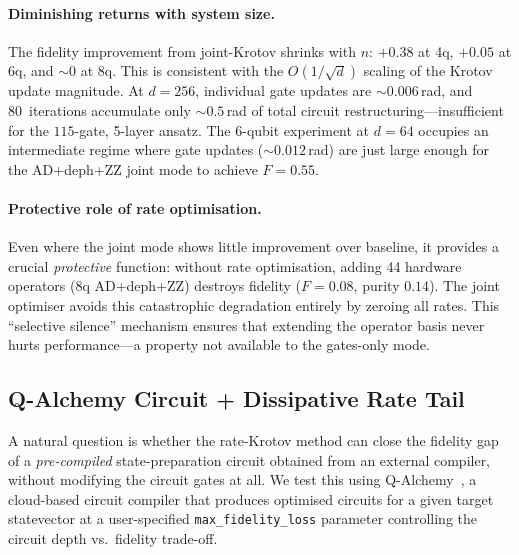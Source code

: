\documentclass[11pt,a4paper]{article}
\begin{document}
\paragraph{Diminishing returns with system size.}
The fidelity improvement from joint-Krotov shrinks with $n$: $+0.38$
at 4q, $+0.05$ at 6q, and ${\sim}0$ at 8q.  This is consistent with
the $O(1/\sqrt{d})$ scaling of the Krotov update magnitude.  At
$d = 256$, individual gate updates are ${\sim}0.006$\,rad, and
80~iterations accumulate only ${\sim}0.5$\,rad of total circuit
restructuring---insufficient for the $115$-gate, 5-layer ansatz.
The 6-qubit experiment at $d = 64$ occupies an intermediate regime
where gate updates (${\sim}0.012$\,rad) are just large enough for
the AD+deph+ZZ joint mode to achieve $F = 0.55$.

\paragraph{Protective role of rate optimisation.}
Even where the joint mode shows little improvement over baseline, it
provides a crucial \emph{protective} function: without rate
optimisation, adding 44 hardware operators (8q AD+deph+ZZ) destroys
fidelity ($F = 0.08$, purity $0.14$).  The joint optimiser avoids
this catastrophic degradation entirely by zeroing all rates.  This
``selective silence'' mechanism ensures that extending the operator
basis never hurts performance---a property not available to the
gates-only mode.


\subsection{Q-Alchemy Circuit + Dissipative Rate Tail}
\label{sec:qalchemy}

A natural question is whether the rate-Krotov method can close the
fidelity gap of a \emph{pre-compiled} state-preparation circuit
obtained from an external compiler, without modifying the circuit
gates at all.  We test this using Q-Alchemy~\cite{qalchemy}, a
cloud-based circuit compiler that produces optimised circuits for a
given target statevector at a user-specified
\texttt{max\_fidelity\_loss} parameter controlling the circuit depth
vs.\ fidelity trade-off.
\end{document}

